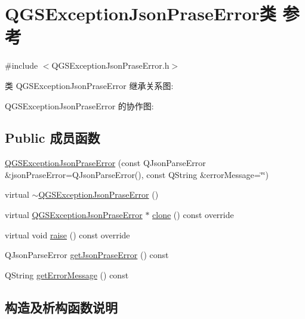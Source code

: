 \hypertarget{class_q_g_s_exception_json_prase_error}{}\section{Q\+G\+S\+Exception\+Json\+Prase\+Error类 参考}
\label{class_q_g_s_exception_json_prase_error}


{\ttfamily \#include $<$Q\+G\+S\+Exception\+Json\+Prase\+Error.\+h$>$}



类 Q\+G\+S\+Exception\+Json\+Prase\+Error 继承关系图\+:


Q\+G\+S\+Exception\+Json\+Prase\+Error 的协作图\+:
\subsection*{Public 成员函数}
\begin{DoxyCompactItemize}
\item 
\mbox{\hyperlink{class_q_g_s_exception_json_prase_error_a9df91fc2665d1d083843a88bc67a5253}{Q\+G\+S\+Exception\+Json\+Prase\+Error}} (const Q\+Json\+Parse\+Error \&json\+Prase\+Error=Q\+Json\+Parse\+Error(), const Q\+String \&error\+Message=\char`\"{}\char`\"{})
\item 
virtual \mbox{\hyperlink{class_q_g_s_exception_json_prase_error_ae77b38c95ba55b690e3f78b7d6709406}{$\sim$\+Q\+G\+S\+Exception\+Json\+Prase\+Error}} ()
\item 
virtual \mbox{\hyperlink{class_q_g_s_exception_json_prase_error}{Q\+G\+S\+Exception\+Json\+Prase\+Error}} $\ast$ \mbox{\hyperlink{class_q_g_s_exception_json_prase_error_a299d1b5dff92fda50864d5b6de676678}{clone}} () const override
\item 
virtual void \mbox{\hyperlink{class_q_g_s_exception_json_prase_error_a6e166d735947b6e55378ad4d11ad1ea3}{raise}} () const override
\item 
Q\+Json\+Parse\+Error \mbox{\hyperlink{class_q_g_s_exception_json_prase_error_a5c656ac5892392ba5b63a65222e8f612}{get\+Json\+Prase\+Error}} () const
\item 
Q\+String \mbox{\hyperlink{class_q_g_s_exception_json_prase_error_a13742099f6ab5e448fc887c6d3db78fb}{get\+Error\+Message}} () const
\end{DoxyCompactItemize}


\subsection{构造及析构函数说明}
\mbox{\label{class_q_g_s_exception_json_prase_error_a9df91fc2665d1d083843a88bc67a5253}} 
